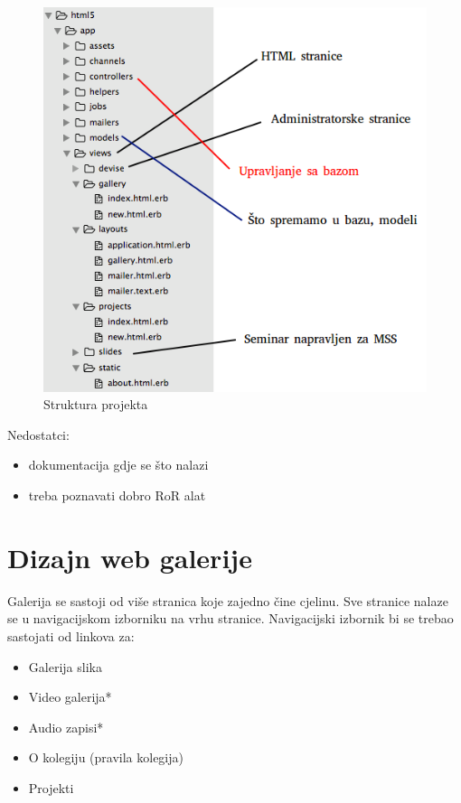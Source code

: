 \documentclass[]{article}
\begin{document}
\begin{figure}[h]
	\centering
	\includegraphics[scale=0.5]{struktura-projekta}
	\caption{Struktura projekta}
	\label{fig:mesh1}
\end{figure}

Nedostatci:
\begin{itemize}
	\item dokumentacija gdje se što nalazi
	\item treba poznavati dobro RoR alat
\end{itemize}
\newpage


\section{Dizajn web galerije}

Galerija se sastoji od više stranica koje zajedno čine cjelinu.
Sve stranice nalaze se u navigacijskom izborniku na vrhu stranice. Navigacijski izbornik bi se trebao sastojati od linkova za:

\begin{itemize}
	\item Galerija slika
	\item Video galerija*
	\item Audio zapisi*
	\item O kolegiju (pravila kolegija)
	\item Projekti
\end{itemize}
\end{document}
